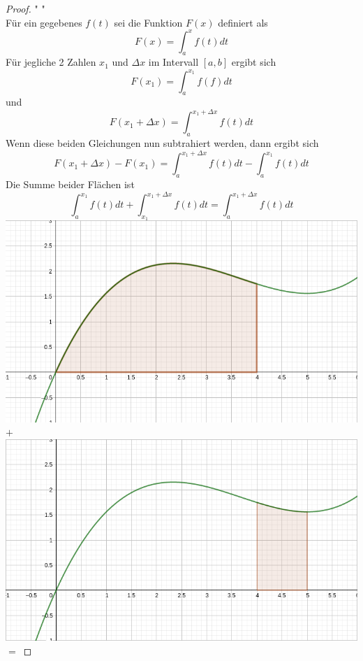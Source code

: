 \documentclass[fontsize=12pt,paper=a4,DIV12,cleardoublepage=empty, 
liststotoc,idxtotoc,bibtotoc]{article}
\theoremstyle{plain}
\theoremstyle{definition}
\begin{document}
	
	\begin{proof}" "\\
		Für ein gegebenes $f(t)$ sei die Funktion $F(x)$ definiert als
		\begin{equation*}
			F(x)=\int_{a}^{x}f(t)dt
		\end{equation*}
		Für jegliche 2 Zahlen $x_1$ und $\Delta x$ im Intervall $[a, b]$ ergibt sich
		\begin{equation*}
			F(x_1)=\int_{a}^{x_1}f(f)dt
		\end{equation*}
		und
		\begin{equation*}
			F(x_1+\Delta x)=\int_{a}^{x_1+\Delta x}f(t)dt
		\end{equation*}
		Wenn diese beiden Gleichungen nun subtrahiert werden, dann ergibt sich
		\begin{equation}
			F(x_1+\Delta x)-F(x_1)=\int_{a}^{x_1+\Delta x}f(t)dt-\int_{a}^{x_1}f(t)dt
		\end{equation}
		Die Summe beider Flächen ist
		\begin{equation*}
			\int_{a}^{x_1}f(t)dt + \int_{x_1}^{x_1+\Delta x}f(t)dt = \int_{a}^{x_1+\Delta x}f(t)dt
		\end{equation*}
		\includegraphics[scale=0.2]{Integral 0-4.png} $+$
		\includegraphics[scale=0.2]{Integral 4-5.png} $=$

\end{proof}
\end{document}
